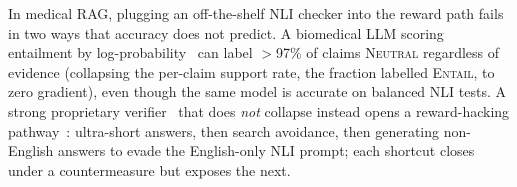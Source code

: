 \documentclass[11pt]{article}
\begin{document}
In medical RAG, plugging an off-the-shelf NLI checker into the reward 
path fails in two ways that accuracy does not predict.
A biomedical LLM scoring entailment by 
log-probability~\citep{sallinen2025llama} can label 
$>$97\% of claims \textsc{Neutral} regardless of 
evidence (collapsing the per-claim support rate, the 
fraction labelled \textsc{Entail}, to zero gradient), 
even though the same model is accurate on balanced 
NLI tests.
A strong proprietary verifier~\citep{achiam2023gpt} that does 
\emph{not} collapse instead opens a reward-hacking 
pathway~\citep{skalse2022defining}: ultra-short answers, then search 
avoidance, then generating non-English answers to evade the 
English-only NLI prompt; each shortcut closes under a 
countermeasure but exposes the next.
\end{document}

